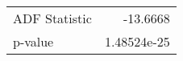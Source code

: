 \begin{tabular}{lr}
\hline
 ADF Statistic & -13.6668      \\
 p-value       &   1.48524e-25 \\
\hline
\end{tabular}